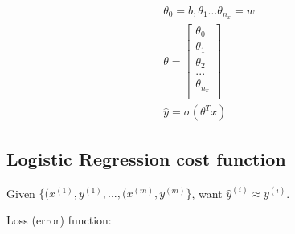 \begin{align}
	\theta_0 = b, \theta_1 ... \theta_{n_x} = w \\
	\theta = \begin{bmatrix} 
				\theta_0 \\
				\theta_1 \\
				\theta_2 \\
				...      \\
				\theta_{n_x} \\
	         \end{bmatrix} \\
	\hat{y} = \sigma{(\theta^Tx)}
\end{align}


\subsection{Logistic Regression cost function}

Given $\{ (x^{(1)}, y^{(1)}, ..., (x^{(m)}, y^{(m)} \}$,
want $\hat{y}^{(i)} \approx {y}^{(i)}$.

Loss (error) function:
